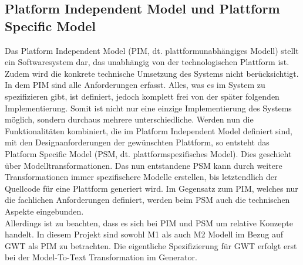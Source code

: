 \subsection{Platform Independent Model und Plattform Specific Model} \label{PIMPSM}
Das Platform Independent Model (PIM, dt. plattformunabhängiges Modell) stellt ein
Softwaresystem dar, das unabhängig von der technologischen Plattform ist. Zudem wird die konkrete technische Umsetzung des Systems nicht berücksichtigt. In dem PIM
sind alle Anforderungen erfasst. Alles, was es im System zu spezifizieren gibt, ist definiert,
jedoch komplett frei von der später folgenden Implementierung. Somit ist nicht nur eine
einzige Implementierung des Systems möglich, sondern durchaus mehrere
unterschiedliche.
Werden nun die Funktionalitäten kombiniert, die im Platform Independent Model definiert sind, mit den Designanforderungen der gewünschten Plattform, so entsteht das Platform Specific Model (PSM, dt. plattformspezifisches Model). Dies geschieht über Modelltransformationen. Das nun entstandene PSM kann durch weitere Transformationen immer spezifischere Modelle erstellen, bis letztendlich der Quellcode für eine Plattform generiert wird. Im Gegensatz zum PIM, welches nur die
fachlichen Anforderungen definiert, werden beim PSM auch die technischen Aspekte
eingebunden.\cite[S.377 ff.]{bib:MDA2}\cite{bib:MDA3}\\ 
 
Allerdings ist zu beachten, dass es sich bei PIM und PSM um relative Konzepte handelt. 
In diesem Projekt sind sowohl M1 als auch M2 Modell im Bezug auf GWT als PIM zu betrachten. Die eigentliche Spezifizierung für GWT erfolgt erst bei der Model-To-Text Transformation im Generator.